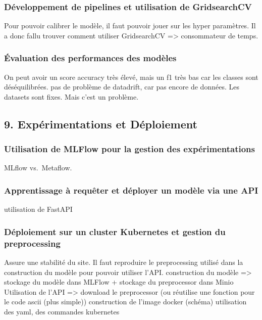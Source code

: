 \documentclass[
  letterpaper,
  DIV=11,
  numbers=noendperiod]{scrartcl}
\begin{document}
\subsubsection{Développement de pipelines et utilisation de
GridsearchCV}\label{duxe9veloppement-de-pipelines-et-utilisation-de-gridsearchcv}

Pour pouvoir calibrer le modèle, il faut pouvoir jouer sur les hyper
paramètres. Il a donc fallu trouver comment utiliser GridsearchCV
=\textgreater{} consommateur de temps.

\subsubsection{Évaluation des performances des
modèles}\label{uxe9valuation-des-performances-des-moduxe8les}

On peut avoir un score accuracy très élevé, mais un f1 très bas car les
classes sont déséquilibrées. pas de problème de datadrift, car pas
encore de données. Les datasets sont fixes. Mais c'est un problème.

\subsection{9. Expérimentations et
Déploiement}\label{expuxe9rimentations-et-duxe9ploiement}

\subsubsection{Utilisation de MLFlow pour la gestion des
expérimentations}\label{utilisation-de-mlflow-pour-la-gestion-des-expuxe9rimentations}

MLflow vs.~Metaflow.

\subsubsection{Apprentissage à requêter et déployer un modèle via une
API}\label{apprentissage-uxe0-requuxeater-et-duxe9ployer-un-moduxe8le-via-une-api}

utilisation de FastAPI

\subsubsection{Déploiement sur un cluster Kubernetes et gestion du
preprocessing}\label{duxe9ploiement-sur-un-cluster-kubernetes-et-gestion-du-preprocessing}

Assure une stabilité du site. Il faut reproduire le preprocessing
utilisé dans la construction du modèle pour pouvoir utiliser l'API.
construction du modèle =\textgreater{} stockage du modèle dans MLFlow +
stockage du preprocessor dans Minio Utilisation de l'API =\textgreater{}
download le preprocessor (ou réutilise une fonction pour le code ascii
(plus simple)) construction de l'image docker (schéma) utilisation des
yaml, des commandes kubernetes
\end{document}
